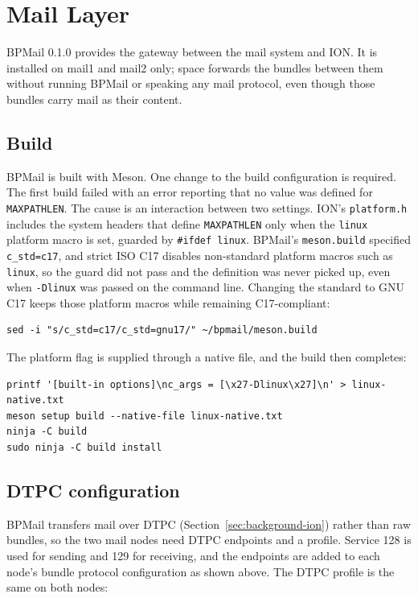 \section{Mail Layer}

BPMail 0.1.0 provides the gateway between the mail system and ION. It is installed on mail1 and mail2 only; space forwards the bundles between them without running BPMail or speaking any mail protocol, even though those bundles carry mail as their content.


\subsection{Build}

BPMail is built with Meson. One change to the build configuration is required. The
first build failed with an error reporting that no value was defined for
\texttt{MAXPATHLEN}. The cause is an interaction between two settings. ION's
\texttt{platform.h} includes the system headers that define \texttt{MAXPATHLEN} only
when the \texttt{linux} platform macro is set, guarded by \texttt{\#ifdef linux}.
BPMail's \texttt{meson.build} specified \texttt{c\_std=c17}, and strict ISO C17
disables non-standard platform macros such as \texttt{linux}, so the guard did not pass and the definition was never picked up, even when \texttt{-Dlinux} was passed
on the command line. Changing the standard to GNU C17 keeps those platform macros
while remaining C17-compliant:

\begin{lstlisting}
sed -i "s/c_std=c17/c_std=gnu17/" ~/bpmail/meson.build
\end{lstlisting}

The platform flag is supplied through a native file, and the build then completes:

\begin{lstlisting}
printf '[built-in options]\nc_args = [\x27-Dlinux\x27]\n' > linux-native.txt
meson setup build --native-file linux-native.txt
ninja -C build
sudo ninja -C build install
\end{lstlisting}

\subsection{DTPC configuration}

BPMail transfers mail over DTPC (Section~\ref{sec:background-ion}) rather than raw bundles, so the two mail nodes need DTPC endpoints and a profile. Service 128 is used for sending and 129 for receiving, and the endpoints are added to each node's bundle protocol configuration as shown above. The DTPC profile is the same on both nodes:

